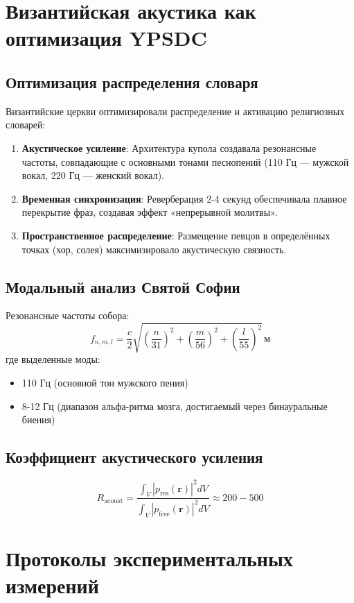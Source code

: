\documentclass[12pt,a4paper]{article}
\begin{document}
	\section{Византийская акустика как оптимизация YPSDC}
	
	\subsection{Оптимизация распределения словаря}
	
	Византийские церкви оптимизировали распределение и активацию религиозных словарей:
	
	\begin{enumerate}
		\item \textbf{Акустическое усиление}: Архитектура купола создавала резонансные частоты, совпадающие с основными тонами песнопений (110 Гц — мужской вокал, 220 Гц — женский вокал).
		\item \textbf{Временная синхронизация}: Реверберация 2-4 секунд обеспечивала плавное перекрытие фраз, создавая эффект «непрерывной молитвы».
		\item \textbf{Пространственное распределение}: Размещение певцов в определённых точках (хор, солея) максимизировало акустическую связность.
	\end{enumerate}
	
	\subsection{Модальный анализ Святой Софии}
	
	Резонансные частоты собора:
	\[
	f_{n,m,l} = \frac{c}{2} \sqrt{\left(\frac{n}{31}\right)^2 + \left(\frac{m}{56}\right)^2 + \left(\frac{l}{55}\right)^2} \, \mathrm{м}
	\]
	где выделенные моды:
	\begin{itemize}
		\item 110 Гц (основной тон мужского пения)
		\item 8-12 Гц (диапазон альфа-ритма мозга, достигаемый через бинауральные биения)
	\end{itemize}
	
	\subsection{Коэффициент акустического усиления}
	\[
	R_{\mathrm{acoust}} = \frac{\int_V |p_{\mathrm{res}}(\mathbf{r})|^2 dV}{\int_V |p_{\mathrm{free}}(\mathbf{r})|^2 dV} \approx 200-500
	\]
	
	\section{Протоколы экспериментальных измерений}
	
\end{document}
